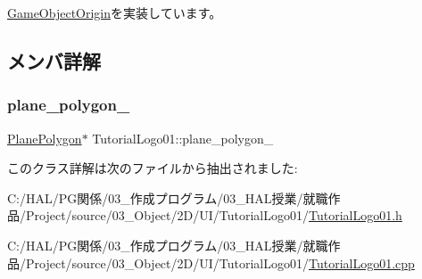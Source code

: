 \mbox{\hyperlink{class_game_object_origin_aeac8fc4a1f625982313a9a60dd35d016}{Game\+Object\+Origin}}を実装しています。



\subsection{メンバ詳解}
\mbox{\label{class_tutorial_logo01_ae38e16b590122bec07b503ed08224d85}} 
\subsubsection{\texorpdfstring{plane\+\_\+polygon\+\_\+}{plane\_polygon\_}}
{\footnotesize\ttfamily \mbox{\hyperlink{class_plane_polygon}{Plane\+Polygon}}$\ast$ Tutorial\+Logo01\+::plane\+\_\+polygon\+\_\+}



このクラス詳解は次のファイルから抽出されました\+:\begin{DoxyCompactItemize}
\item 
C\+:/\+H\+A\+L/\+P\+G関係/03\+\_\+作成プログラム/03\+\_\+\+H\+A\+L授業/就職作品/\+Project/source/03\+\_\+\+Object/2\+D/\+U\+I/\+Tutorial\+Logo01/\mbox{\hyperlink{_tutorial_logo01_8h}{Tutorial\+Logo01.\+h}}\item 
C\+:/\+H\+A\+L/\+P\+G関係/03\+\_\+作成プログラム/03\+\_\+\+H\+A\+L授業/就職作品/\+Project/source/03\+\_\+\+Object/2\+D/\+U\+I/\+Tutorial\+Logo01/\mbox{\hyperlink{_tutorial_logo01_8cpp}{Tutorial\+Logo01.\+cpp}}\end{DoxyCompactItemize}
